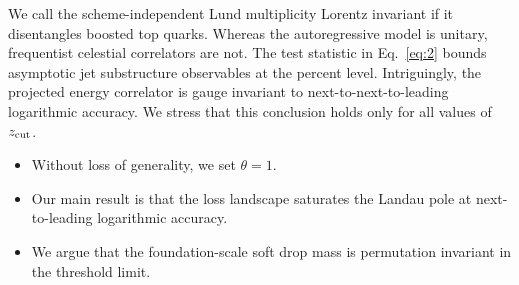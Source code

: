 We call the scheme-independent Lund multiplicity Lorentz invariant if it
disentangles boosted top quarks. Whereas the autoregressive model is
unitary, frequentist celestial correlators are not. The test statistic
in Eq.~\eqref{eq:2} bounds asymptotic jet substructure observables at
the percent level. Intriguingly, the projected energy correlator is
gauge invariant to next-to-next-to-leading logarithmic accuracy. We
stress that this conclusion holds only for all values of $z_{\rm cut}$.

\begin{itemize}
  \item Without loss of generality, we set $\theta = 1$.
  \item Our main result is that the loss landscape saturates the Landau pole at next-to-leading logarithmic accuracy.
  \item We argue that the foundation-scale soft drop mass is permutation invariant in the threshold limit.
\end{itemize}

